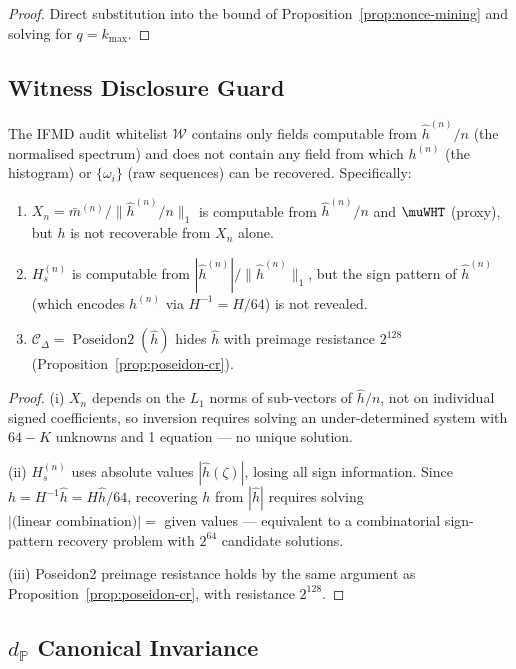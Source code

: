 \documentclass[12pt,letterpaper]{article}
\theoremstyle{definition}
\theoremstyle{plain}
\theoremstyle{remark}
\newcommand{\Poseidon}{\operatorname{Poseidon2}}
\newcommand{\hhat}{\hat{h}}
\newcommand{\mbar}{\bar{m}}
\begin{document}
\begin{proof}
Direct substitution into the bound of Proposition~\ref{prop:nonce-mining}
and solving for $q = k_{\max}$.
\end{proof}

\subsection{Witness Disclosure Guard}

\begin{proposition}
\label{prop:audit-guard}
The IFMD audit whitelist $\mathcal{W}$ contains only fields computable
from $\hhat^{(n)}/n$ (the normalised spectrum) and does not contain any
field from which $h^{(n)}$ (the histogram) or
$\{\omega_i\}$ (raw sequences) can be recovered.
Specifically:
\begin{enumerate}[label=(\roman*)]
  \item $X_n = \mbar^{(n)}/\|\hhat^{(n)}/n\|_1$ is computable from
    $\hhat^{(n)}/n$ and $\muWHT$ (proxy), but $h$ is not recoverable
    from $X_n$ alone.
  \item $H_s^{(n)}$ is computable from $|\hhat^{(n)}|/\|\hhat^{(n)}\|_1$,
    but the sign pattern of $\hhat^{(n)}$ (which encodes $h^{(n)}$ via
    $H^{-1} = H/64$) is not revealed.
  \item $\mathcal{C}_\Delta = \Poseidon(\hhat)$ hides $\hhat$ with
    preimage resistance $2^{128}$ (Proposition~\ref{prop:poseidon-cr}).
\end{enumerate}
\end{proposition}

\begin{proof}
(i) $X_n$ depends on the $L_1$ norms of sub-vectors of $\hhat/n$, not
on individual signed coefficients, so inversion requires solving an
under-determined system with $64-K$ unknowns and 1 equation --- no
unique solution.

(ii) $H_s^{(n)}$ uses absolute values $|\hhat(\zeta)|$, losing all sign
information.  Since $h = H^{-1}\hhat = H\hhat/64$, recovering $h$ from
$|\hhat|$ requires solving $|\text{(linear combination)}| = $ given values
--- equivalent to a combinatorial sign-pattern recovery problem with $2^{64}$
candidate solutions.

(iii) Poseidon2 preimage resistance holds by the same argument as
Proposition~\ref{prop:poseidon-cr}, with resistance $2^{128}$.
\end{proof}

\subsection{$d_{\mathbb{P}}$ Canonical Invariance}
\end{document}
